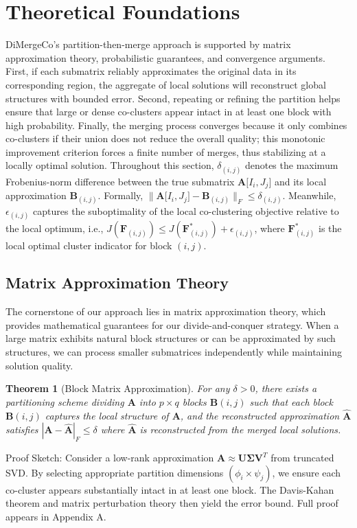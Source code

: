 \documentclass[journal]{IEEEtran}
\newtheorem{theorem}{Theorem}
\begin{document}
\section{Theoretical Foundations}
\label{sec:theoretical_foundations}
DiMergeCo's partition-then-merge approach is supported by matrix approximation theory, probabilistic guarantees, and convergence arguments. First, if each submatrix reliably approximates the original data in its corresponding region, the aggregate of local solutions will reconstruct global structures with bounded error. Second, repeating or refining the partition helps ensure that large or dense co-clusters appear intact in at least one block with high probability. Finally, the merging process converges because it only combines co-clusters if their union does not reduce the overall quality; this monotonic improvement criterion forces a finite number of merges, thus stabilizing at a locally optimal solution.
Throughout this section, $\delta_{(i,j)}$ denotes the maximum Frobenius-norm difference between the true submatrix $\mathbf{A}\lbrack I_i,J_j\rbrack $ and its local approximation $\mathbf{B}_{(i,j)}$. Formally, $\|\mathbf{A}\lbrack I_i, J_j\rbrack - \mathbf{B}_{(i,j)}\|_F \leq \delta_{(i,j)}$. Meanwhile, $\epsilon_{(i,j)}$ captures the suboptimality of the local co-clustering objective relative to the local optimum, i.e., $J(\mathbf{F}_{(i,j)}) \leq J(\mathbf{F}_{(i,j)}^*) + \epsilon_{(i,j)}$, where $\mathbf{F}_{(i,j)}^*$ is the local optimal cluster indicator for block $(i,j)$.
\subsection{Matrix Approximation Theory}
The cornerstone of our approach lies in matrix approximation theory, which provides mathematical guarantees for our divide-and-conquer strategy. When a large matrix exhibits natural block structures or can be approximated by such structures, we can process smaller submatrices independently while maintaining solution quality.
\begin{theorem}[Block Matrix Approximation]
    For any $\delta > 0$, there exists a partitioning scheme dividing $\mathbf{A}$ into $p \times q$ blocks ${\mathbf{B}{(i,j)}}$ such that each block $\mathbf{B}{(i,j)}$ captures the local structure of $\mathbf{A}$, and the reconstructed approximation $\hat{\mathbf{A}}$ satisfies $|\mathbf{A} - \hat{\mathbf{A}}|_F \le \delta$ where $\hat{\mathbf{A}}$ is reconstructed from the merged local solutions.
\end{theorem}
Proof Sketch: Consider a low-rank approximation $\mathbf{A} \approx \mathbf{U}\mathbf{\Sigma}\mathbf{V}^T$ from truncated SVD. By selecting appropriate partition dimensions $(\phi_i \times \psi_j)$, we ensure each co-cluster appears substantially intact in at least one block. The Davis-Kahan theorem and matrix perturbation theory then yield the error bound. Full proof appears in Appendix A.
\end{document}
